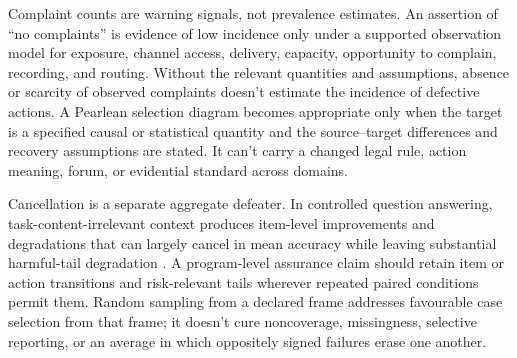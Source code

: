 Complaint counts are warning signals, not prevalence estimates. An assertion of \enquote{no complaints} is evidence of low incidence only under a supported observation model for exposure, channel access, delivery, capacity, opportunity to complain, recording, and routing. Without the relevant quantities and assumptions, absence or scarcity of observed complaints doesn't estimate the incidence of defective actions. A Pearlean selection diagram becomes appropriate only when the target is a specified causal or statistical quantity and the source--target differences and recovery assumptions are stated. It can't carry a changed legal rule, action meaning, forum, or evidential standard across domains.

Cancellation is a separate aggregate defeater. In controlled question answering, task-content-irrelevant context produces item-level improvements and degradations that can largely cancel in mean accuracy while leaving substantial harmful-tail degradation \citep{zhang2026illusionRobustness}. A program-level assurance claim should retain item or action transitions and risk-relevant tails wherever repeated paired conditions permit them. Random sampling from a declared frame addresses favourable case selection from that frame; it doesn't cure noncoverage, missingness, selective reporting, or an average in which oppositely signed failures erase one another.
